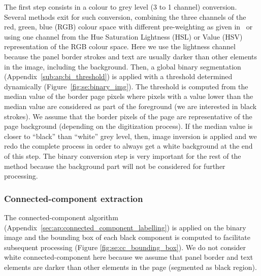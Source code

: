 The first step consists in a colour to grey level (3 to 1 channel) conversion.
Several methods exit for such conversion, combining the three channels of the red, green, blue (RGB) colour space with different pre-weighting as given in~\cite{Pratt91} or using one channel from the Hue Saturation Lightness (HSL) or Value (HSV) representation of the RGB colour space.
Here we use the lightness channel because the panel border strokes and text are usually darker than other elements in the image, including the background. 
Then, a global binary segmentation (Appendix~\ref{sub:ap:bi_threshold}) is applied with a threshold determined dynamically (Figure~\ref{fig:se:binary_img}).
The threshold is computed from the median value of the border page pixels where pixels with a value lower than the median value are considered as part of the foreground (we are interested in black strokes).
We assume that the border pixels of the page are representative of the page background (depending on the digitization process).
If the median value is closer to ``black'' than ``white'' grey level, then, image inversion is applied and we redo the complete process in order to always get a white background at the end of this step.
The binary conversion step is very important for the rest of the method because the background part will not be considered for further processing. %


\subsubsection{Connected-component extraction} %
 \label{par:connected_component_extraction}
 
The connected-component algorithm (Appendix~\ref{sec:ap:connected_component_labelling}) is applied on the binary image and the bounding box of each black component is computed to facilitate subsequent processing (Figure \ref{fig:se:cc_bounding_box}).
We do not consider white connected-component here because we assume that panel border and text elements are darker than other elements in the page (segmented as black region).

